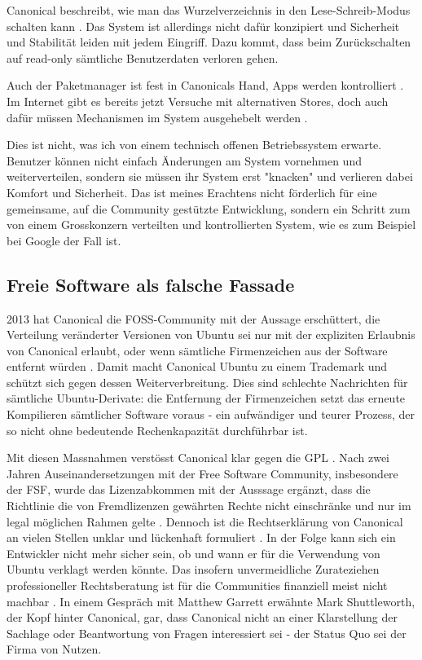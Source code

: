 Canonical beschreibt, wie man das Wurzelverzeichnis in den Lese-Schreib-Modus schalten kann \cite{online:ubuntutouch-readwrite}. Das System ist allerdings nicht dafür konzipiert und Sicherheit und Stabilität leiden mit jedem Eingriff. Dazu kommt, dass beim Zurückschalten auf read-only sämtliche Benutzerdaten verloren gehen.

Auch der Paketmanager ist fest in Canonicals Hand, Apps werden kontrolliert \cite{online:ubuntutouch-publish}. Im Internet gibt es bereits jetzt Versuche mit alternativen Stores, doch auch dafür müssen Mechanismen im System ausgehebelt werden \cite{online:ubuntutouch-jailbreak}.

Dies ist nicht, was ich von einem technisch offenen Betriebssystem erwarte. Benutzer können nicht einfach Änderungen am System vornehmen und weiterverteilen, sondern sie müssen ihr System erst "knacken" und verlieren dabei Komfort und Sicherheit. Das ist meines Erachtens nicht förderlich für eine gemeinsame, auf die Community gestützte Entwicklung, sondern ein Schritt zum von einem Grosskonzern verteilten und kontrollierten System, wie es zum Beispiel bei Google der Fall ist.\\

\subsection{Freie Software als falsche Fassade}
2013 hat Canonical die FOSS-Community mit der Aussage erschüttert, die Verteilung veränderter Versionen von Ubuntu sei nur mit der expliziten Erlaubnis von Canonical erlaubt, oder wenn sämtliche Firmenzeichen aus der Software entfernt würden \cite{online:ubuntutouch-mjgIn}. Damit macht Canonical Ubuntu zu einem Trademark und schützt sich gegen dessen Weiterverbreitung. Dies sind schlechte Nachrichten für sämtliche Ubuntu-Derivate: die Entfernung der Firmenzeichen setzt das erneute Kompilieren sämtlicher Software voraus \cite{online:ubuntutouch-mjgLicense} - ein aufwändiger und teurer Prozess, der so nicht ohne bedeutende Rechenkapazität durchführbar ist.

Mit diesen Massnahmen verstösst Canonical klar gegen die GPL \cite{online:ubuntutouch-fsf}. Nach zwei Jahren Auseinandersetzungen mit der Free Software Community, insbesondere der FSF, wurde das Lizenzabkommen mit der Ausssage ergänzt, dass die Richtlinie die von Fremdlizenzen gewährten Rechte nicht einschränke und nur im legal möglichen Rahmen gelte \cite{online:ubuntutouch-ip}. Dennoch ist die Rechtserklärung von Canonical an vielen Stellen unklar und lückenhaft formuliert \cite{online:ubuntutouch-uncertain}. In der Folge kann sich ein Entwickler nicht mehr sicher sein, ob und wann er für die Verwendung von Ubuntu verklagt werden könnte. Das insofern unvermeidliche Zurateziehen professioneller Rechtsberatung ist für die Communities finanziell meist nicht machbar \cite{online:ubuntutouch-mjgLicense}. In einem Gespräch mit Matthew Garrett \cite{online:ubuntutouch-mjgConversation} erwähnte Mark Shuttleworth, der Kopf hinter Canonical, gar, dass Canonical nicht an einer Klarstellung der Sachlage oder Beantwortung von Fragen interessiert sei - der Status Quo sei der Firma von Nutzen.

